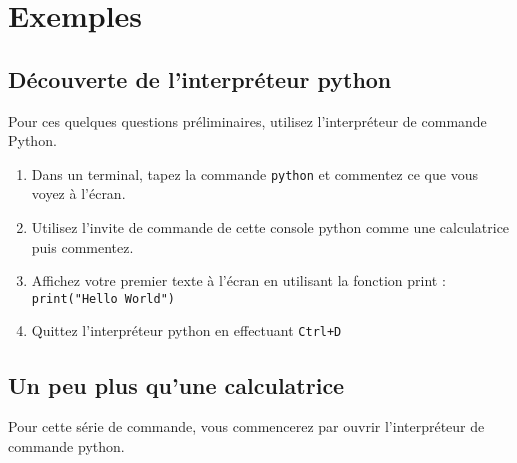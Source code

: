 \section{Exemples}

\subsection{Découverte de l'interpréteur python}

Pour ces quelques questions préliminaires, utilisez l'interpréteur de commande Python.

\begin{enumerate}

\item Dans un terminal, tapez la commande \texttt{python} et commentez ce que vous voyez à l'écran.

\item Utilisez l'invite de commande de cette console python comme une calculatrice puis commentez.

\item Affichez votre premier texte à l'écran en utilisant la fonction print : \\
   \texttt{print("Hello World")}

\item Quittez l'interpréteur python en effectuant  \texttt{Ctrl+D}

\end{enumerate}


\subsection{Un peu plus qu'une calculatrice}

Pour cette série de commande, vous commencerez par ouvrir l'interpréteur de commande python.

